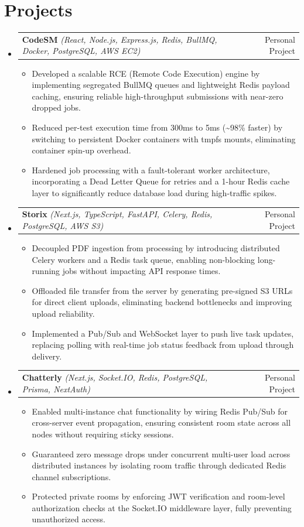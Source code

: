 \documentclass[letterpaper,10pt]{article}
\makeatletter
\newenvironment{resumeList}{
  \begin{itemize}[leftmargin=0.15in, label={}]
}{
  \end{itemize}
}
\newcommand{\resumeItem}[1]{
  \item\small{
    {#1 \vspace{-2.5pt}}
  }
}
\newcommand{\resumeProjectHeading}[3]{
  \vspace{-2pt}\item
    \begin{tabular*}{0.97\textwidth}[t]{l@{\extracolsep{\fill}}r}
      \textbf{#1} \textit{\small(#2)} & #3 \\
    \end{tabular*}\vspace{-6pt}
}
\newcommand{\resumeItemListStart}{\begin{itemize}[leftmargin=0.15in]}
\newcommand{\resumeItemListEnd}{\end{itemize}\vspace{-5pt}}
\makeatother
\begin{document}
\section{Projects}
\begin{resumeList}
    \resumeProjectHeading
    {CodeSM}{React, Node.js, Express.js, Redis, BullMQ, Docker, PostgreSQL, AWS EC2}{Personal Project}
  \resumeItemListStart
    \resumeItem{Developed a scalable RCE (Remote Code Execution) engine by implementing segregated BullMQ queues and lightweight Redis payload caching, ensuring reliable high-throughput submissions with near-zero dropped jobs.}
    \resumeItem{Reduced per-test execution time from 300ms to 5ms (\textasciitilde{}98\% faster) by switching to persistent Docker containers with tmpfs mounts, eliminating container spin-up overhead.}
    \resumeItem{Hardened job processing with a fault-tolerant worker architecture, incorporating a Dead Letter Queue for retries and a 1-hour Redis cache layer to significantly reduce database load during high-traffic spikes.}
  \resumeItemListEnd

  \resumeProjectHeading
    {Storix}{Next.js, TypeScript, FastAPI, Celery, Redis, PostgreSQL, AWS S3}{Personal Project}
  \resumeItemListStart
    \resumeItem{Decoupled PDF ingestion from processing by introducing distributed Celery workers and a Redis task queue, enabling non-blocking long-running jobs without impacting API response times.}
    \resumeItem{Offloaded file transfer from the server by generating pre-signed S3 URLs for direct client uploads, eliminating backend bottlenecks and improving upload reliability.}
    \resumeItem{Implemented a Pub/Sub and WebSocket layer to push live task updates, replacing polling with real-time job status feedback from upload through delivery.}
  \resumeItemListEnd

  \resumeProjectHeading
    {Chatterly}{Next.js, Socket.IO, Redis, PostgreSQL, Prisma, NextAuth}{Personal Project}
  \resumeItemListStart
    \resumeItem{Enabled multi-instance chat functionality by wiring Redis Pub/Sub for cross-server event propagation, ensuring consistent room state across all nodes without requiring sticky sessions.}
    \resumeItem{Guaranteed zero message drops under concurrent multi-user load across distributed instances by isolating room traffic through dedicated Redis channel subscriptions.}
    \resumeItem{Protected private rooms by enforcing JWT verification and room-level authorization checks at the Socket.IO middleware layer, fully preventing unauthorized access.}
  \resumeItemListEnd
\end{resumeList}
\end{document}
